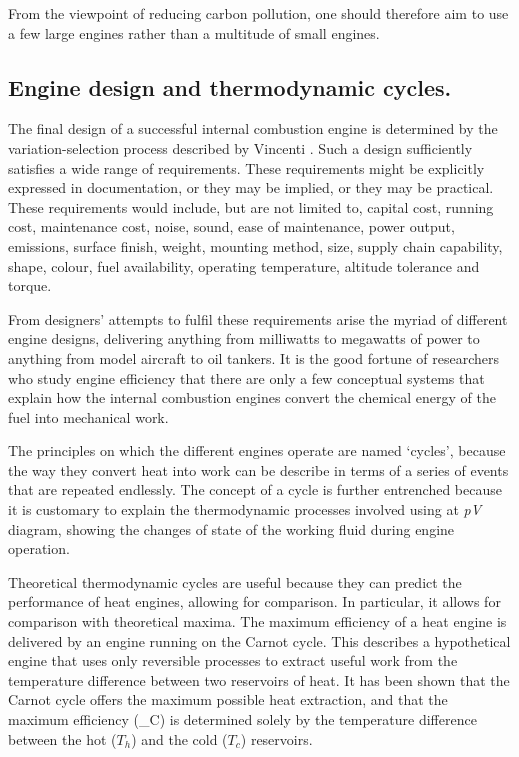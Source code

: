 From the viewpoint of reducing carbon pollution, one should therefore aim to use
a few large engines rather than a multitude of small engines.

\subsection{Engine design and thermodynamic cycles.} \label{par:efficiency}

The final design of a successful internal combustion engine is determined by the
variation-selection process described by Vincenti \autocite{Vincenti1990}. Such
a design sufficiently satisfies a wide range of requirements. These requirements
might be explicitly expressed in documentation, or they may be implied, or they
may be practical. These requirements would include, but are not limited to,
capital cost, running cost, maintenance cost, noise, sound, ease of maintenance, power
output, emissions, surface finish, weight, mounting method, size, supply chain
capability, shape, colour, fuel availability, operating temperature, altitude
tolerance and torque.

From designers' attempts to fulfil these requirements arise the myriad of
different engine designs, delivering anything from milliwatts to megawatts of
power to anything from model aircraft to oil tankers. It is the good fortune of
researchers who study engine efficiency that there are only a few conceptual
systems that explain how the internal combustion engines convert the chemical
energy of the fuel into mechanical work.

The principles on which the different engines operate are named `cycles',
because the way they convert heat into work can be describe in terms of a series
of events that are repeated endlessly. The concept of a cycle is
further entrenched because it is customary to explain the thermodynamic
processes involved using at \textit{pV} diagram, showing the changes of state of
the working fluid during engine operation.

Theoretical thermodynamic cycles are useful because they can predict the
performance of heat engines, allowing for comparison. In particular, it allows
for comparison with theoretical maxima. The maximum efficiency of a heat engine
is delivered by an engine running on the Carnot cycle. This describes a
hypothetical engine that uses only reversible processes to extract useful work
from the temperature difference between two reservoirs of heat. It has been
shown that the Carnot cycle offers the maximum possible heat extraction, and
that the maximum efficiency (\eta_{C}\)) is determined solely by the temperature
difference between the hot (\(T_h\)) and the cold (\(T_c\)) reservoirs.

